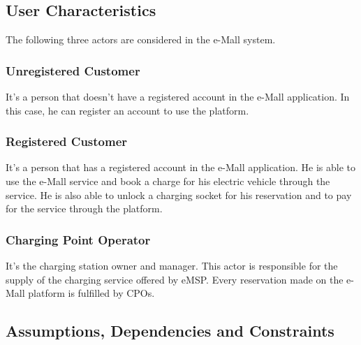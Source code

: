 \subsection{User Characteristics}
The following three actors are considered in the e-Mall system.
\subsubsection{Unregistered Customer}
It's a person that doesn't have a registered account in the e-Mall application. 
In this case, he can register an account to use the platform.
\subsubsection{Registered Customer}
It's a person that has a registered account in the e-Mall application. 
He is able to use the e-Mall service and book a charge for his electric vehicle through the service.
He is also able to unlock a charging socket for his reservation and to pay for the service through the platform.
\subsubsection{Charging Point Operator}
It's the charging station owner and manager. This actor is responsible for the supply of the charging service offered by eMSP. 
Every reservation made on the e-Mall platform is fulfilled by CPOs.
\subsection{Assumptions, Dependencies and Constraints}
